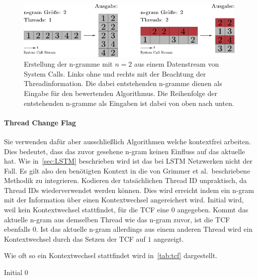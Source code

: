                 \begin{figure}
                    \includegraphics[width=\textwidth]{images/ngram.pdf}
                    \caption{Erstellung der n-gramme mit $n=2$ aus einem Datenstream von System Calls.
                        Links ohne und rechts mit der Beachtung der Threadinformation.
                        Die dabei entstehenden n-gramme dienen als Eingabe für den bewertenden Algorithmus.
                        Die Reihenfolge der entstehenden n-gramme als Eingaben ist dabei von oben nach unten.
                    }\label{fig:ngram_thread}
                \end{figure}

            \paragraph{Thread Change Flag}
                Sie verwenden dafür aber ausschließlich Algorithmen welche kontextfrei arbeiten.
                Dies bedeutet, dass das zuvor gesehene n-gram keinen Einfluss auf das aktuelle hat.
                Wie in~\autoref{sec:LSTM} beschrieben wird ist das bei \ac{LSTM} Netzwerken nicht der Fall.
                Es gilt also den benötigten Kontext in die von Grimmer et al.\ beschriebene Methodik zu integrieren.
                Kodieren der tatsächlichen Thread ID unpraktisch, da Thread IDs wiederverwendet werden können.
                Dies wird erreicht indem ein n-gram mit der Information über einen Kontextwechsel angereichert wird. 
                Initial wird, weil kein Kontextwechsel stattfindet, für die \ac{TCF} eine $0$ angegeben.
                Kommt das aktuelle n-gram aus demselben Thread wie das n-gram zuvor, ist die \ac{TCF} ebenfalls $0$.
                Ist das aktuelle n-gram allerdings aus einem anderen Thread wird ein Kontextwechsel durch das Setzen der \ac{TCF} auf $1$ angezeigt.

                Wie oft so ein Kontextwechsel stattfindet wird in~\autoref{tab:tcf} dargestellt.
                

                Initial 0

